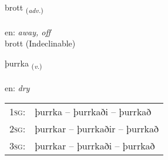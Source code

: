 \documentclass[frontgrid, backgrid]{flacards}\usepackage[]{graphicx}\usepackage[]{xcolor}
\begin{document}

\renewcommand{\flhead}{\vskip5pt \fboxsep=0pt {\small\bfseries\footnotesize Atviksorð | Adverb}}
\renewcommand{\fcfoot}{\vskip5pt \fboxsep=0pt \hspace{2pt}{\small\bfseries\footnotesize 3K}}

\renewcommand{\blhead}{\vskip5pt {\small\bfseries\footnotesize Atviksorð | Adverb }}
\renewcommand{\bcfoot}{\vskip5pt \hspace{2pt}{\small\bfseries\footnotesize 3K}}


{brott \small{\textsubscript{(\textit{adv.})}} \\[1ex]
\textphonetic{[prɔht]} \\
en: \emph{away, off} \\  [2ex]
brott (Indeclinable)}

\renewcommand{\flhead}{\vskip5pt \fboxsep=0pt {\small\bfseries\footnotesize Sagnorð | Verb}}
\renewcommand{\fcfoot}{\vskip5pt \fboxsep=0pt \hspace{2pt}{\small\bfseries\footnotesize 3K}}

\renewcommand{\blhead}{\vskip5pt {\small\bfseries\footnotesize Sagnorð | Verb }}
\renewcommand{\bcfoot}{\vskip5pt \hspace{2pt}{\small\bfseries\footnotesize 3K}}


{þurrka \small{\textsubscript{(\textit{v.})}} \\[1ex] %
\textphonetic{[θʏr̥ka]} \\
en: \emph{dry} \\  [2ex]
\renewcommand*{\arraystretch}{0.8}
\begin{tabular}{p{1cm}l}
\textsc{1sg}: & þurrka -- þurrkaði -- þurrkað \\ 
\textsc{2sg}: & þurrkar -- þurrkaðir -- þurrkað \\ 
\textsc{3sg}: & þurrkar -- þurrkaði -- þurrkað \\ 
\end{tabular}
}

\renewcommand{\flhead}{\vskip5pt \fboxsep=0pt {\small\bfseries\footnotesize Sagnorð | Verb}}
\renewcommand{\fcfoot}{\vskip5pt \fboxsep=0pt \hspace{2pt}{\small\bfseries\footnotesize 3K}}
\end{document}
